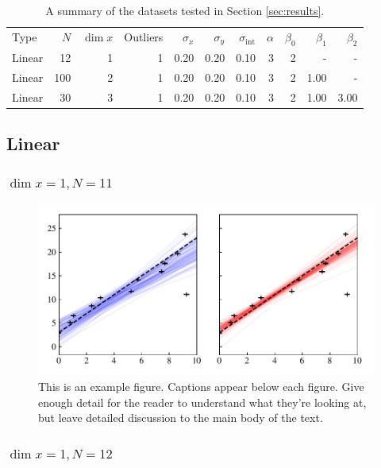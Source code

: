 \begin{table}
	\centering
	\caption{A summary of the datasets tested in Section \ref{sec:results}.}
	\label{tab:results.datasets}
    \begin{tabular}{lrrrrrrrrrr}
Type & $N$ & $\dim x$ & Outliers & $\sigma_{x}$ & $\sigma_{y}$ & $\sigma_{\text{int}}$ & $\alpha$ & $\beta_0$ & $\beta_1$ & $\beta_2$ \\
Linear & 12 & 1 & 1 & 0.20 & 0.20 & 0.10 & 3 & 2 & - & - \\
Linear & 100 & 2 & 1 & 0.20 & 0.20 & 0.10 & 3 & 2 & 1.00 & - \\
Linear & 30 & 3 & 1 & 0.20 & 0.20 & 0.10 & 3 & 2 & 1.00 & 3.00 \\
\end{tabular}

\end{table}

\subsection{ Linear }

\subsubsection{$\dim x = 1, N = 11$}

\begin{figure}
	\includegraphics[width=\textwidth]{graphics/regression_Linear_1D1_cauchy.pdf}
    \caption{This is an example figure. Captions appear below each figure.
	Give enough detail for the reader to understand what they're looking at,
	but leave detailed discussion to the main body of the text.}
    \label{fig:example_widefigure}
\end{figure}

\subsubsection{$\dim x = 1, N = 12$}

